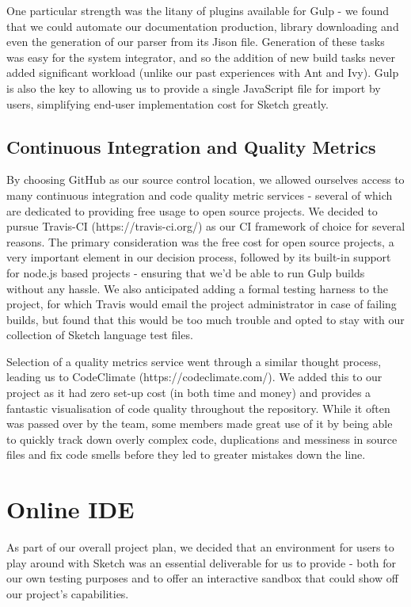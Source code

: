 \documentclass{l3proj}
\begin{document}
One particular strength was the litany of plugins available for Gulp - we found that we could automate our documentation production, library downloading and even the generation of our parser from its Jison file. Generation of these tasks was easy for the system integrator, and so the addition of new build tasks never added significant workload (unlike our past experiences with Ant and Ivy). Gulp is also the key to allowing us to provide a single JavaScript file for import by users, simplifying end-user implementation cost for Sketch greatly.

\section{Continuous Integration and Quality Metrics}
\label{dev-ci}
By choosing GitHub as our source control location, we allowed ourselves access to many continuous integration and code quality metric services - several of which are dedicated to providing free usage to open source projects. We decided to pursue Travis-CI (https://travis-ci.org/) as our CI framework of choice for several reasons. The primary consideration was the free cost for open source projects, a very important element in our decision process, followed by its built-in support for node.js based projects - ensuring that we'd be able to run Gulp builds without any hassle. We also anticipated adding a formal testing harness to the project, for which Travis would email the project administrator in case of failing builds, but found that this would be too much trouble and opted to stay with our collection of Sketch language test files.

Selection of a quality metrics service went through a similar thought process, leading us to CodeClimate (https://codeclimate.com/). We added this to our project as it had zero set-up cost (in both time and money) and provides a fantastic visualisation of code quality throughout the repository. While it often was passed over by the team, some members made great use of it by being able to quickly track down overly complex code, duplications and messiness in source files and fix code smells before they led to greater mistakes down the line.
\chapter{Online IDE}
\label{ide}
As part of our overall project plan, we decided that an environment for users to play around with Sketch was an essential deliverable for us to provide - both for our own testing purposes and to offer an interactive sandbox that could show off our project's capabilities.
\end{document}
